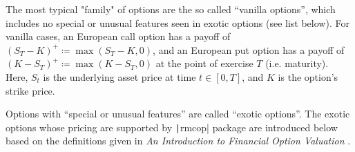 The most typical "family" of options are the so called ``vanilla options'', which includes no special or unusual features seen in exotic options (see list below). For vanilla cases, an European call option has a payoff of $(S_T-K)^+ \coloneqq \max{(S_T-K,0)}$, and an European put option has a payoff of $(K-S_T)^+ \coloneqq \max{(K-S_T,0)}$ \cite{Glasserman2003} at the point of exercise $T$ (i.e. maturity). Here, $S_t$ is the underlying asset price at time $t\in[0,T]$, and $K$ is the option's strike price.

Options with ``special or unusual features'' are called ``exotic options''. The exotic options whose pricing are supported by \texttt|rmcop| package are introduced below based on the definitions given in \textit{An Introduction to Financial Option Valuation} \cite{Higham2004}.

